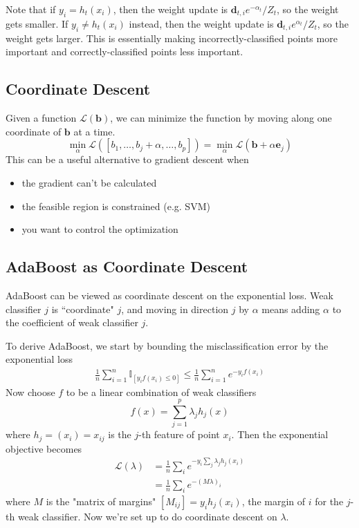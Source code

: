 \documentclass{article}
\begin{document}
Note that if $y_i = h_t(x_i)$, then the weight update is $\mathbf{d}_{t,i} e^{-\alpha_t}/Z_t$, so the weight gets smaller. If $y_i \neq h_t(x_i)$ instead, then the weight update is $\mathbf{d}_{t,i} e^{\alpha_t}/Z_t$, so the weight gets larger. This is essentially making incorrectly-classified points more important and correctly-classified points less important.


\subsection{Coordinate Descent}
Given a function $\mathcal{L}(\mathbf{b})$, we can minimize the function by moving along one coordinate of $\mathbf{b}$ at a time.
\[
	\min_\alpha \mathcal{L}\left( \left[ b_1,\dots,b_j+\alpha,\dots,b_p \right] \right) = \min_\alpha \mathcal{L}\left( \mathbf{b}+\alpha\mathbf{e}_j \right)
\] 
This can be a useful alternative to gradient descent when
\begin{itemize}
	\item the gradient can't be calculated
	\item the feasible region is constrained (e.g. SVM)
	\item you want to control the optimization
\end{itemize}


\subsection{AdaBoost as Coordinate Descent}
AdaBoost can be viewed as coordinate descent on the exponential loss. Weak classifier $j$ is ``coordinate" $j$, and moving in direction $j$ by $\alpha$ means adding $\alpha$ to the coefficient of weak classifier $j$.

To derive AdaBoost, we start by bounding the misclassification error by the exponential loss
\begin{align*}
	\frac{1}{n} \sum_{i=1}^{n} \mathbb{I}_{[y_i f(x_i) \leq 0]} \leq \frac{1}{n} \sum_{i=1}^{n} e^{-y_i f(x_i)}
\end{align*}
Now choose $f$ to be a linear combination of weak classifiers
\[
	f(x) = \sum_{j=1}^{p} \lambda_j h_j(x)
\] 
where $h_j=(x_i)=x_{ij}$ is the $j$-th feature of point $x_i$. Then the exponential objective becomes
\begin{align*}
	\mathcal{L}(\lambda) &= \frac{1}{n} \sum_i e^{-y_i \sum_j \lambda_j h_j(x_i)} \\
			     &= \frac{1}{n} \sum_i e^{-(M\lambda)_i}
\end{align*}
where $M$ is the "matrix of margins" $[M_{ij}]=y_i h_j (x_i)$, the margin of $i$ for the $j$-th weak classifier. Now we're set up to do coordinate descent on $\lambda$.
\end{document}
